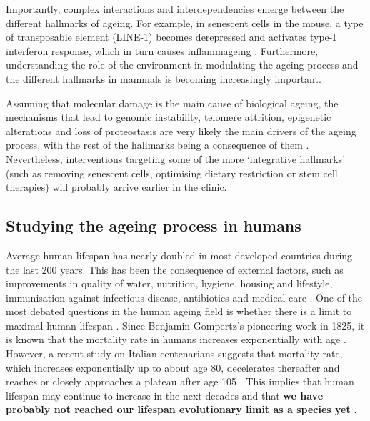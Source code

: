 Importantly, complex interactions and interdependencies emerge between the different hallmarks of ageing. For example, in senescent cells in the mouse, a type of transposable element (LINE-1) becomes derepressed and activates type-I interferon response, which in turn causes inflammageing \cite{DeCecco2019}. Furthermore, understanding the role of the environment in modulating the ageing process and the different hallmarks in mammals is becoming increasingly important.  

\bigskip

Assuming that molecular damage is the main cause of biological ageing, the mechanisms that lead to genomic instability, telomere attrition, epigenetic alterations and loss of proteostasis are very likely the main drivers of the ageing process, with the rest of the hallmarks being a consequence of them \cite{Lopez-Otin2013}. Nevertheless, interventions targeting some of the more `integrative hallmarks' (such as removing senescent cells, optimising dietary restriction or stem cell therapies) will probably arrive earlier in the clinic.

\smallskip

\subsection{Studying the ageing process in humans}

\smallskip

Average human lifespan has nearly doubled in most developed countries during the last 200 years. This has been the consequence of external factors, such as improvements in quality of water, nutrition, hygiene, housing and lifestyle, immunisation against infectious disease, antibiotics and medical care \cite{Partridge2018}. One of the most debated questions in the human ageing field is whether there is a limit to maximal human lifespan \cite{Dong2016}. Since Benjamin Gompertz's pioneering work in 1825, it is known that the mortality rate in humans increases exponentially with age \cite{Gompertz1825}. However, a recent study on Italian centenarians suggests that mortality rate, which increases exponentially up to about age 80, decelerates thereafter and reaches or closely approaches a plateau after age 105 \cite{Barbi2018}. This implies that human lifespan may continue to increase in the next decades and that \textbf{we have probably not reached our lifespan evolutionary limit as a species yet} \cite{Barbi2018,Kontis2017}. 

\bigskip

